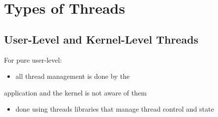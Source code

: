 \documentclass[11pt]{article}
\begin{document}
\section{Types of Threads}
\label{sec:org74348e2}
\subsection{User-Level and Kernel-Level Threads}
\label{sec:org1b5d58c}
For pure user-level:
\begin{itemize}
\item all thread management is done by the
\end{itemize}
application and the kernel is not aware of them
\begin{itemize}
\item done using threads libraries that manage
thread control and state
\end{itemize}
\end{document}
